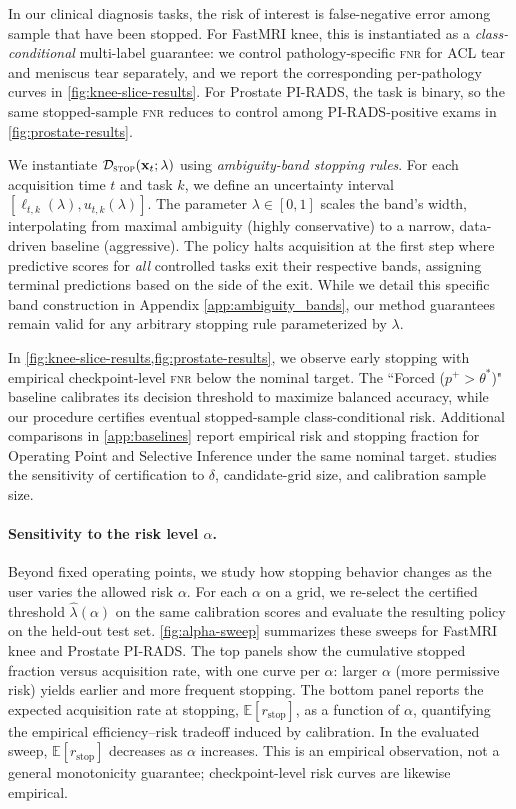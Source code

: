 In our clinical diagnosis tasks, the risk of interest is false-negative error among sample that have been stopped.
For FastMRI knee, this is instantiated as a \emph{class-conditional} multi-label guarantee: we control pathology-specific \textsc{fnr} for ACL tear and meniscus tear separately, and we report the corresponding per-pathology curves in \cref{fig:knee-slice-results}.
For Prostate PI-RADS, the task is binary, so the same stopped-sample \textsc{fnr} reduces to control among PI-RADS-positive exams in \cref{fig:prostate-results}.

We instantiate $\mathcal{D}_\textsc{stop}(\mathbf{x}_t; \lambda)$ using \emph{ambiguity-band stopping rules}. For each acquisition time $t$ and task $k$, we define an uncertainty interval $[\ell_{t,k}(\lambda), u_{t,k}(\lambda)]$. The parameter $\lambda \in [0, 1]$ scales the band's width, interpolating from maximal ambiguity (highly conservative) to a narrow, data-driven baseline (aggressive). The policy halts acquisition at the first step where predictive scores for \emph{all} controlled tasks exit their respective bands, assigning terminal predictions based on the side of the exit. While we detail this specific band construction in Appendix \ref{app:ambiguity_bands}, our \gls{method} guarantees remain valid for any arbitrary stopping rule parameterized by $\lambda$. 

In \cref{fig:knee-slice-results,fig:prostate-results}, we observe early stopping with empirical checkpoint-level \textsc{fnr} below the nominal target. The ``Forced ($p^+ > \theta^*$)" baseline calibrates its decision threshold to maximize balanced accuracy, while our procedure certifies eventual stopped-sample class-conditional risk. Additional comparisons in \cref{app:baselines} report empirical risk and stopping fraction for Operating Point and Selective Inference under the same nominal target.  studies the sensitivity of certification to $\delta$, candidate-grid size, and calibration sample size.

\paragraph{Sensitivity to the risk level $\alpha$.}
Beyond fixed operating points, we study how stopping behavior changes as the user varies the allowed risk $\alpha$.
For each $\alpha$ on a grid, we re-select the certified threshold $\widehat{\lambda}(\alpha)$ on the same calibration scores and evaluate the resulting policy on the held-out test set.
\cref{fig:alpha-sweep} summarizes these sweeps for FastMRI knee and Prostate PI-RADS.
The top panels show the cumulative stopped fraction versus acquisition rate, with one curve per $\alpha$: larger $\alpha$ (more permissive risk) yields earlier and more frequent stopping.
The bottom panel reports the expected acquisition rate at stopping, $\mathbb{E}[r_{\mathrm{stop}}]$, as a function of $\alpha$, quantifying the empirical efficiency--risk tradeoff induced by calibration. In the evaluated sweep, $\mathbb{E}[r_{\mathrm{stop}}]$ decreases as $\alpha$ increases. This is an empirical observation, not a general monotonicity guarantee; checkpoint-level risk curves are likewise empirical.


